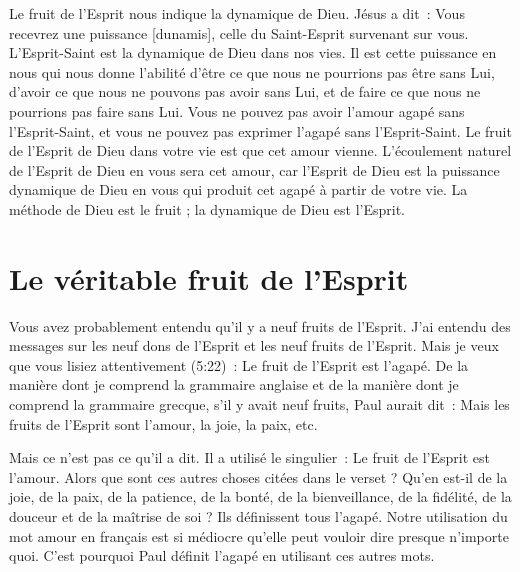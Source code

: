 \og Le fruit de l'Esprit \fg{} nous indique la dynamique de Dieu.
 Jésus a dit~: \og Vous recevrez une puissance [dunamis],
 celle du Saint-Esprit survenant sur vous. \fg{}
 L'Esprit-Saint est la dynamique de Dieu dans nos vies.
 Il est cette puissance en nous qui nous donne l'abilité
 d'être ce que nous ne pourrions pas être sans Lui,
 d'avoir ce que nous ne pouvons pas avoir sans Lui,
 et de faire ce que nous ne pourrions pas faire sans Lui.
 Vous ne pouvez pas avoir l'amour agapé sans l'Esprit-Saint,
 et vous ne pouvez pas exprimer l'agapé sans l'Esprit-Saint.
 Le fruit de l'Esprit de Dieu dans votre vie est que cet amour vienne.
 L'écoulement naturel de l'Esprit de Dieu en vous sera cet amour,
 car l'Esprit de Dieu est la puissance dynamique de Dieu
 en vous qui produit cet agapé à partir de votre vie.
 La méthode de Dieu est le fruit ; la dynamique de Dieu est l'Esprit.


\section*{Le véritable fruit de l'Esprit}

Vous avez probablement entendu qu'il y a neuf fruits de l'Esprit.
 J'ai entendu des messages sur les neuf dons de l'Esprit
 et les neuf fruits de l'Esprit. Mais je veux que vous lisiez
 attentivement (5:22)~:
 \og Le fruit de l'Esprit est l'agapé. \fg{}
 De la manière dont je comprend la grammaire anglaise
 et de la manière dont je comprend la grammaire grecque,
 s'il y avait neuf fruits, Paul aurait dit~:
 \og Mais les fruits de l'Esprit sont l'amour, la joie, la paix, etc. \fg{}

Mais ce n'est pas ce qu'il a dit. Il a utilisé le singulier~:
 \og Le fruit de l'Esprit est l'amour. \fg{}
 Alors que sont ces autres choses citées dans le verset ?
 Qu'en est-il de la joie, de la paix, de la patience, de la bonté,
 de la bienveillance, de la fidélité, de la douceur
 et de la maîtrise de soi ? Ils définissent tous l'agapé.
 Notre utilisation du mot \og amour \fg{} en français est si médiocre
 qu'elle peut vouloir dire presque n'importe quoi.
 C'est pourquoi Paul définit l'agapé en utilisant ces autres mots.

